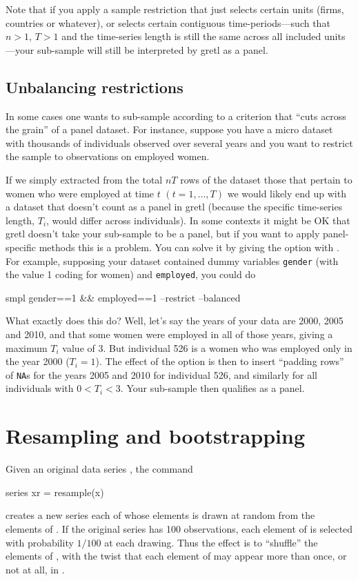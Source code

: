 Note that if you apply a sample restriction that just selects certain
units (firms, countries or whatever), or selects certain contiguous
time-periods---such that $n>1$, $T>1$ and the time-series length is
still the same across all included units---your sub-sample will still
be interpreted by gretl as a panel.


\subsection{Unbalancing restrictions}

In some cases one wants to sub-sample according to a criterion that
``cuts across the grain'' of a panel dataset. For instance, suppose you
have a micro dataset with thousands of individuals observed over
several years and you want to restrict the sample to observations on
employed women.  

If we simply extracted from the total $nT$ rows of the dataset those
that pertain to women who were employed at time $t$ $(t = 1,\dots,T)$
we would likely end up with a dataset that doesn't count as a panel in
gretl (because the specific time-series length, $T_i$, would differ
across individuals). In some contexts it might be OK that gretl
doesn't take your sub-sample to be a panel, but if you want to apply
panel-specific methods this is a problem. You can solve it by giving
the  option with . For example, supposing
your dataset contained dummy variables \texttt{gender} (with the value
1 coding for women) and \texttt{employed}, you could do
%
\begin{code}
smpl gender==1 && employed==1 --restrict --balanced
\end{code}
%
What exactly does this do? Well, let's say the years of your data are
2000, 2005 and 2010, and that some women were employed in all of those
years, giving a maximum $T_i$ value of 3. But individual 526 is a
women who was employed only in the year 2000 ($T_i = 1$). The effect
of the  option is then to insert ``padding rows'' of
\texttt{NA}s for the years 2005 and 2010 for individual 526, and
similarly for all individuals with $0 < T_i < 3$. Your sub-sample
then qualifies as a panel.


\section{Resampling and bootstrapping}
\label{sec:resampling}

Given an original data series , the command
%
\begin{code}
series xr = resample(x)
\end{code}
%
creates a new series each of whose elements is drawn at random from
the elements of .  If the original series has 100
observations, each element of  is selected with probability
$1/100$ at each drawing.  Thus the effect is to ``shuffle'' the
elements of , with the twist that each element of
 may appear more than once, or not at all, in .

